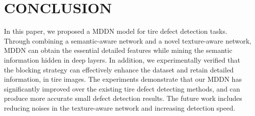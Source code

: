 \documentclass{article}
\begin{document}
%
%
%




\section{CONCLUSION}
\label{sec:typestyle}

In this paper, we proposed a MDDN model for tire defect detection tasks. Through combining a semantic-aware network and a novel texture-aware network, MDDN can obtain the essential detailed features while mining the semantic information hidden in deep layers. In addition, we experimentally verified that the blocking strategy can effectively enhance the dataset and retain detailed information, in tire images. The experiments demonstrate that our MDDN has significantly improved over the existing tire defect detecting methods, and can produce more accurate small defect detection results. The future work includes reducing noises in the texture-aware network and increasing detection speed.


\vfill\pagebreak





\end{document}
